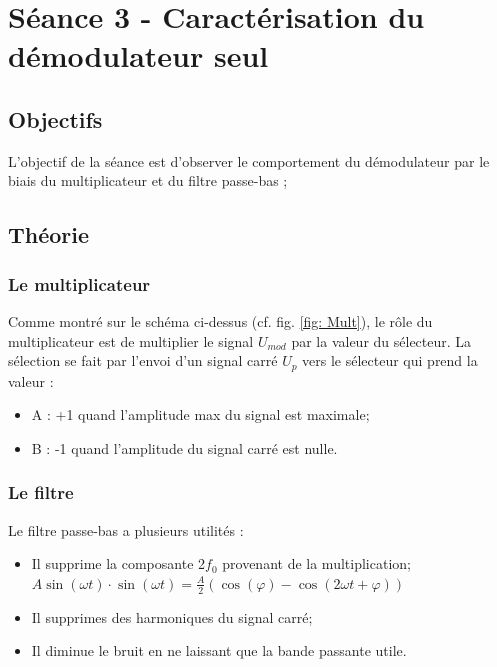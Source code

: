 

\section{Séance 3 - Caractérisation du démodulateur seul}

\subsection{Objectifs}

    L'objectif de la séance est d'observer le comportement du démodulateur par le biais du
    multiplicateur et du filtre passe-bas ;

  

\subsection{Théorie}

\subsubsection{Le multiplicateur}


Comme montré sur le schéma ci-dessus (cf. fig. \ref{fig: Mult}), le rôle du multiplicateur
est de multiplier le signal $U_{mod}$ par la valeur du sélecteur. La sélection se fait par l'envoi
d'un signal carré $U_p$ vers le sélecteur qui prend la valeur :

\begin{itemize}
    \item A : +1 quand l'amplitude max du signal est maximale;
    \item B : -1 quand l'amplitude du signal carré est nulle. 
\end{itemize}

\subsubsection{Le filtre}

Le filtre passe-bas a plusieurs utilités :

\begin{itemize}
    \item Il supprime la composante 2$f_0$ provenant de la multiplication;\\
   $ A \sin(\omega t) \cdot \sin(\omega t) = \frac{A}{2} \left( \cos(\varphi) - \cos(2\omega t + \varphi) \right)$
    \item Il supprimes des harmoniques du signal carré;
    \item Il diminue le bruit en ne laissant que la bande passante utile.
    
\end{itemize}



